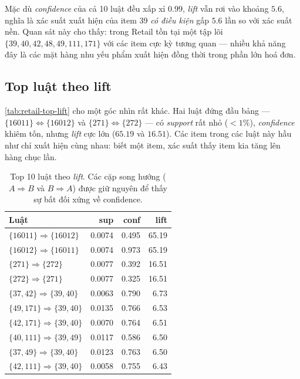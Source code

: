 Mặc dù \textit{confidence} của cả 10 luật đều xấp xỉ $0.99$, \textit{lift} vẫn rơi vào khoảng $5.6$, nghĩa là xác suất xuất hiện của item 39 \emph{có điều kiện} gấp $5.6$ lần so với xác suất nền. Quan sát này cho thấy: trong Retail tồn tại một tập lõi $\{39, 40, 42, 48, 49, 111, 171\}$ với các item cực kỳ tương quan --- nhiều khả năng đây là các mặt hàng nhu yếu phẩm xuất hiện đồng thời trong phần lớn hoá đơn.

\subsection{Top luật theo lift}

\autoref{tab:retail-top-lift} cho một góc nhìn rất khác. Hai luật đứng đầu bảng ---
$\{16011\} \Leftrightarrow \{16012\}$ và $\{271\} \Leftrightarrow \{272\}$ --- có \textit{support} rất nhỏ ($< 1\%$), \textit{confidence} khiêm tốn, nhưng \textit{lift} cực lớn ($65.19$ và $16.51$). Các item trong các luật này hầu như chỉ xuất hiện cùng nhau: biết một item, xác suất thấy item kia tăng lên hàng chục lần.

\begin{table}[htbp]
    \centering
    \caption{Top 10 luật theo \textit{lift}. Các cặp song hướng ($A \Rightarrow B$ và $B \Rightarrow A$) được giữ nguyên để thấy sự bất đối xứng về confidence.}
    \label{tab:retail-top-lift}
    \begin{tabular}{l|r|r|r}
        \hline
        \textbf{Luật} & \textbf{sup} & \textbf{conf} & \textbf{lift} \\ \hline
        $\{16011\} \Rightarrow \{16012\}$ & 0.0074 & 0.495 & 65.19 \\
        $\{16012\} \Rightarrow \{16011\}$ & 0.0074 & 0.973 & 65.19 \\
        $\{271\}   \Rightarrow \{272\}$   & 0.0077 & 0.392 & 16.51 \\
        $\{272\}   \Rightarrow \{271\}$   & 0.0077 & 0.325 & 16.51 \\
        $\{37, 42\}   \Rightarrow \{39, 40\}$ & 0.0063 & 0.790 & 6.73 \\
        $\{49, 171\}  \Rightarrow \{39, 40\}$ & 0.0135 & 0.766 & 6.53 \\
        $\{42, 171\}  \Rightarrow \{39, 40\}$ & 0.0070 & 0.764 & 6.51 \\
        $\{40, 111\}  \Rightarrow \{39, 49\}$ & 0.0117 & 0.586 & 6.50 \\
        $\{37, 49\}   \Rightarrow \{39, 40\}$ & 0.0123 & 0.763 & 6.50 \\
        $\{42, 111\}  \Rightarrow \{39, 40\}$ & 0.0058 & 0.755 & 6.43 \\ \hline
    \end{tabular}
\end{table}

